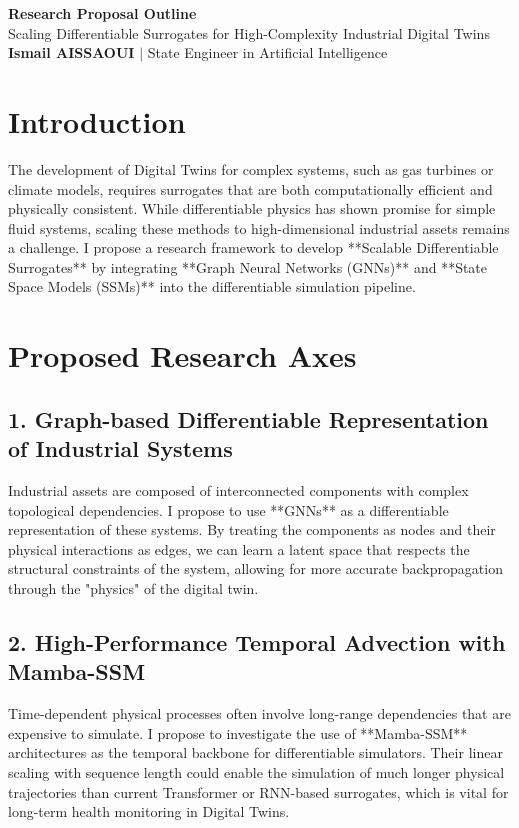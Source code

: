 \documentclass[11pt,a4paper]{article}
\begin{document}
\begin{center}
    {\LARGE\bfseries\color{tumblue} Research Proposal Outline}\\[6pt]
    {\large Scaling Differentiable Surrogates for High-Complexity Industrial Digital Twins}\\[4pt]
    \textbf{Ismail AISSAOUI} $|$ State Engineer in Artificial Intelligence
\end{center}

\bigskip

\section{Introduction}
The development of Digital Twins for complex systems, such as gas turbines or climate models, requires surrogates that are both computationally efficient and physically consistent. While differentiable physics has shown promise for simple fluid systems, scaling these methods to high-dimensional industrial assets remains a challenge. I propose a research framework to develop **Scalable Differentiable Surrogates** by integrating **Graph Neural Networks (GNNs)** and **State Space Models (SSMs)** into the differentiable simulation pipeline.

\section{Proposed Research Axes}

\subsection{1. Graph-based Differentiable Representation of Industrial Systems}
Industrial assets are composed of interconnected components with complex topological dependencies. I propose to use **GNNs** as a differentiable representation of these systems. By treating the components as nodes and their physical interactions as edges, we can learn a latent space that respects the structural constraints of the system, allowing for more accurate backpropagation through the "physics" of the digital twin.

\subsection{2. High-Performance Temporal Advection with Mamba-SSM}
Time-dependent physical processes often involve long-range dependencies that are expensive to simulate. I propose to investigate the use of **Mamba-SSM** architectures as the temporal backbone for differentiable simulators. Their linear scaling with sequence length could enable the simulation of much longer physical trajectories than current Transformer or RNN-based surrogates, which is vital for long-term health monitoring in Digital Twins.
\end{document}

